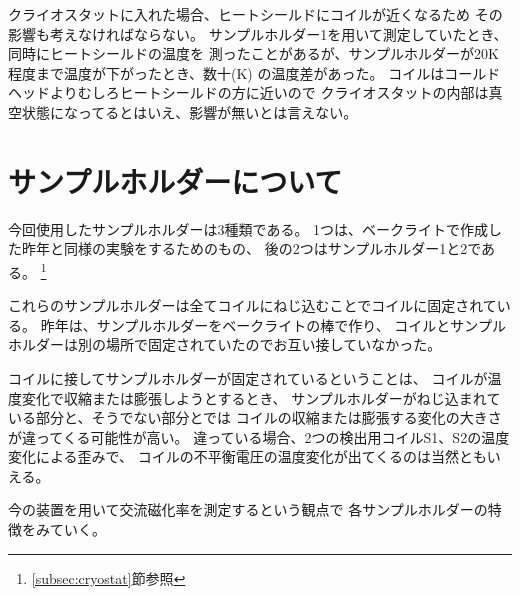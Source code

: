 クライオスタットに入れた場合、ヒートシールドにコイルが近くなるため
その影響も考えなければならない。
サンプルホルダー1を用いて測定していたとき、同時にヒートシールドの温度を
測ったことがあるが、サンプルホルダーが20K程度まで温度が下がったとき、数十(K)
の温度差があった。
コイルはコールドヘッドよりむしろヒートシールドの方に近いので
クライオスタットの内部は真空状態になってるとはいえ、影響が無いとは言えない。


\section{サンプルホルダーについて}\label{sec:サンプルホルダー}

今回使用したサンプルホルダーは3種類である。
1つは、ベークライトで作成した昨年と同様の実験をするためのもの、
後の2つはサンプルホルダー1と2である。
\footnote{\ref{subsec:cryostat}節参照}

これらのサンプルホルダーは全てコイルにねじ込むことでコイルに固定されている。
昨年は、サンプルホルダーをベークライトの棒で作り、
コイルとサンプルホルダーは別の場所で固定されていたのでお互い接していなかった。

コイルに接してサンプルホルダーが固定されているということは、
コイルが温度変化で収縮または膨張しようとするとき、
サンプルホルダーがねじ込まれている部分と、そうでない部分とでは
コイルの収縮または膨張する変化の大きさが違ってくる可能性が高い。
違っている場合、2つの検出用コイルS1、S2の温度変化による歪みで、
コイルの不平衡電圧の温度変化が出てくるのは当然ともいえる。

\bigskip

今の装置を用いて交流磁化率を測定するという観点で
各サンプルホルダーの特徴をみていく。

